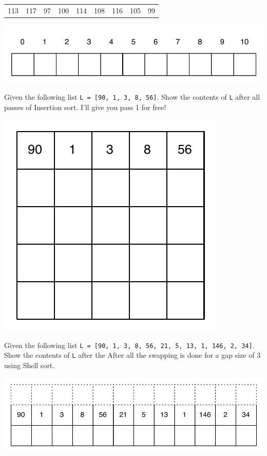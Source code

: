\documentclass[11pt]{exam}
\begin{document}
\begin{questions}
\begin{table}[h!]
    \begin{center}
    \begin{tabular}{|c|c|c|c|c|c|c|c|c|}
    113 & 117 & 97 & 100 & 114 & 108 & 116 & 105 & 99 \\
     \end{tabular}
     \includegraphics{hash_table_11}
    \end{center}
    \label{htab}
\end{table}


\question[10] Given the following list \lstinline{L = [90, 1, 3, 8, 56]}.  Show the contents of \lstinline{L} after all passes of Insertion sort.  I'll give you pass 1 for free!
\begin{center}
\includegraphics{insertion_boxes}
\end{center}



\question[10] Given the following list \lstinline{L = [90, 1, 3, 8, 56, 21, 5, 13, 1, 146, 2, 34]}.  Show the contents of \lstinline{L} after the After all the swapping is done for a gap size of 3 using Shell sort.

\begin{center}
\includegraphics{shell_gaps}
\end{center}


\end{questions}
\end{document}
